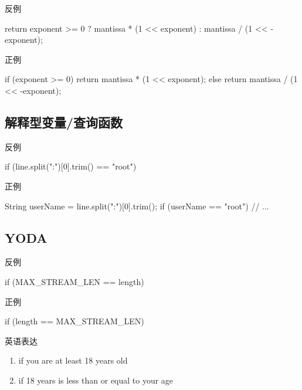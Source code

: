 \begin{frame}[fragile]{反例}
  \begin{c++}
return exponent >= 0 ? mantissa * (1 << exponent) : mantissa / (1 << -exponent);
  \end{c++}
\end{frame}

\begin{frame}[fragile]{正例}
  \begin{c++}
if (exponent >= 0) {
  return mantissa * (1 << exponent);
} else {
  return mantissa / (1 << -exponent);
}
  \end{c++}
\end{frame}

\subsection{解释型变量/查询函数}

\begin{frame}[fragile]{反例}
  \begin{c++}
if (line.split(":")[0].trim() == "root")
  \end{c++}
\end{frame}

\begin{frame}[fragile]{正例}
  \begin{c++}
String userName = line.split(":")[0].trim();
if (userName == "root") {
  // ...
}
  \end{c++}
\end{frame}

\subsection{YODA}

\begin{frame}[fragile]{反例}
  \begin{c++}
if (MAX_STREAM_LEN == length)
  \end{c++}
\end{frame}

\begin{frame}[fragile]{正例}
  \begin{c++}
if (length == MAX_STREAM_LEN)
  \end{c++}
\end{frame}

\begin{frame}[fragile]{英语表达}
\begin{enumerate}
  \item if you are at least 18 years old
  \item if 18 years is less than or equal to your age
\end{enumerate}
\end{frame}

